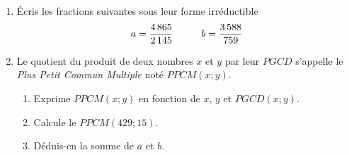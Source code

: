 
\begin{enumerate}
\item \'Ecris les fractions suivantes sous leur forme irréductible
\[a=\frac{4\,865}{2\,145}\kern1cm b=\frac{3\,588}{759}\]
\item Le quotient du produit de deux nombres $x$ et $y$ par leur $PGCD$
s'appelle le {\em Plus Petit Commun Multiple} noté $PPCM(x;y)$.
\begin{enumerate}
\item Exprime $PPCM(x;y)$ en fonction de $x$, $y$ et $PGCD(x;y)$.
\item Calcule le $PPCM(429;15)$.
\item Déduis-en la somme de $a$ et $b$.
\end{enumerate}
\end{enumerate}
